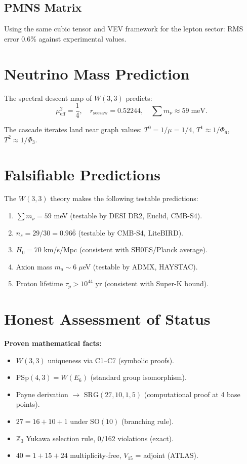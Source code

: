 \documentclass[12pt]{article}
\begin{document}
\subsection{PMNS Matrix}

Using the same cubic tensor and VEV framework for the lepton sector:
RMS error $0.6\%$ against experimental values.

\section{Neutrino Mass Prediction}
\label{sec:neutrino}

The spectral descent map of $W(3,3)$ predicts:
\[
  \mu_{\mathrm{eff}}^2 = \frac{1}{4}, \quad
  r_{\mathrm{seesaw}} = 0.52244, \quad
  \sum m_\nu \approx 59\;\mathrm{meV}.
\]

The cascade iterates land near graph values:
$T^0 = 1/\mu = 1/4$, $T^1 \approx 1/\Phi_6$, $T^2 \approx 1/\Phi_3$.

\section{Falsifiable Predictions}
\label{sec:predictions}

The $W(3,3)$ theory makes the following testable predictions:
\begin{enumerate}
\item $\sum m_\nu = 59$ meV (testable by DESI DR2, Euclid, CMB-S4).
\item $n_s = 29/30 = 0.96\overline{6}$ (testable by CMB-S4, LiteBIRD).
\item $H_0 = 70$ km/s/Mpc (consistent with SH0ES/Planck average).
\item Axion mass $m_a \sim 6\;\mu$eV (testable by ADMX, HAYSTAC).
\item Proton lifetime $\tau_p > 10^{44}$ yr (consistent with Super-K bound).
\end{enumerate}

\section*{Honest Assessment of Status}

\noindent\textbf{Proven mathematical facts:}
\begin{itemize}
\item $W(3,3)$ uniqueness via C1--C7 (symbolic proofs).
\item $\mathrm{PSp}(4,3) = W(E_6)$ (standard group isomorphism).
\item Payne derivation $\to$ $\mathrm{SRG}(27,10,1,5)$ (computational proof at 4 base points).
\item $27 = 16 + 10 + 1$ under $\mathrm{SO}(10)$ (branching rule).
\item $\mathbb{Z}_3$ Yukawa selection rule, 0/162 violations (exact).
\item $40 = 1 + 15 + 24$ multiplicity-free, $V_{15}$ = adjoint (ATLAS).
\end{itemize}
\end{document}
